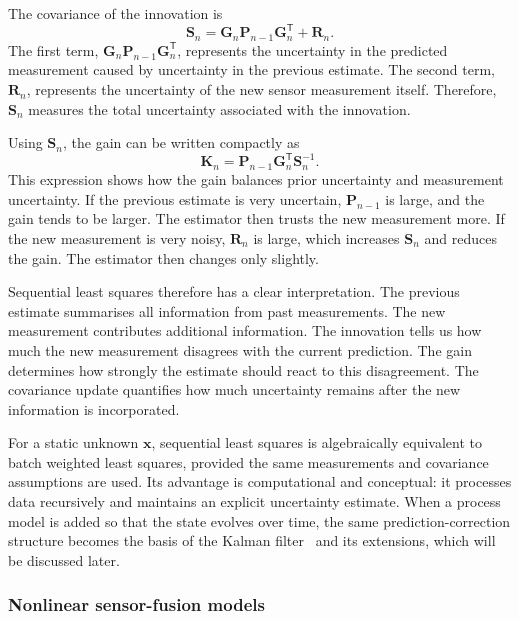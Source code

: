 \documentclass{ieeeaccess}
\begin{document}
The covariance of the innovation is
\begin{equation}
\mathbf{S}_n
=
\mathbf{G}_n
\mathbf{P}_{n-1}
\mathbf{G}_n^{\mathsf T}
+
\mathbf{R}_n.
\end{equation}
The first term, $\mathbf{G}_n\mathbf{P}_{n-1}\mathbf{G}_n^{\mathsf T}$, represents the uncertainty in the predicted measurement caused by uncertainty in the previous estimate. The second term, $\mathbf{R}_n$, represents the uncertainty of the new sensor measurement itself. Therefore, $\mathbf{S}_n$ measures the total uncertainty associated with the innovation.

Using $\mathbf{S}_n$, the gain can be written compactly as
\begin{equation}
\mathbf{K}_n
=
\mathbf{P}_{n-1}
\mathbf{G}_n^{\mathsf T}
\mathbf{S}_n^{-1}.
\end{equation}
This expression shows how the gain balances prior uncertainty and measurement uncertainty. If the previous estimate is very uncertain, $\mathbf{P}_{n-1}$ is large, and the gain tends to be larger. The estimator then trusts the new measurement more. If the new measurement is very noisy, $\mathbf{R}_n$ is large, which increases $\mathbf{S}_n$ and reduces the gain. The estimator then changes only slightly.



Sequential least squares therefore has a clear interpretation. The previous estimate summarises all information from past measurements. The new measurement contributes additional information. The innovation tells us how much the new measurement disagrees with the current prediction. The gain determines how strongly the estimate should react to this disagreement. The covariance update quantifies how much uncertainty remains after the new information is incorporated.

For a static unknown $\mathbf{x}$, sequential least squares is algebraically equivalent to batch weighted least squares, provided the same measurements and covariance assumptions are used. Its advantage is computational and conceptual: it processes data recursively and maintains an explicit uncertainty estimate. When a process model is added so that the state evolves over time, the same prediction-correction structure becomes the basis of the Kalman filter~\cite{kalman_1960} and its extensions, which will be discussed later.

\subsubsection{Nonlinear sensor-fusion models}
\end{document}

